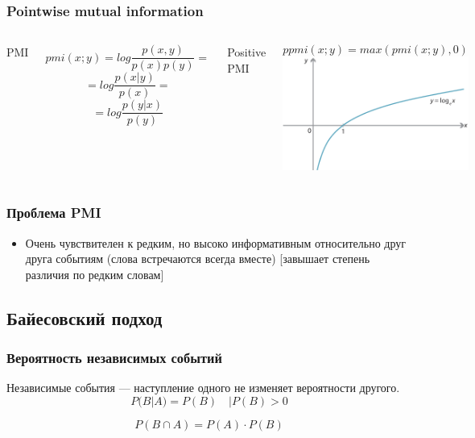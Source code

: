 \documentclass[svgnames]{beamer}
\begin{document}
\begin{frame}
  \frametitle{Pointwise mutual information}
  \begin{columns}
    PMI

  $$
  pmi(x;y) = log \frac{p(x,y)}{p(x)p(y)} =
  $$
  $$
  = log \frac{p(x|y)}{p(x)} =
  $$
  $$
  = log \frac{p(y|x)}{p(y)}
  $$

  Positive PMI

    $$
    ppmi(x;y) = max(pmi(x;y),0)
    $$    
  \includegraphics[width=\textwidth]{log}
  \end{columns}
\end{frame}

\begin{frame}
  \frametitle{Проблема PMI}
  \begin{itemize}
  \item Очень чувствителен к редким, но высоко информативным
    относительно друг друга событиям (слова встречаются всегда вместе)
    [завышает степень различия по редким словам]
  \end{itemize}
\end{frame}

\subsection{Байесовский подход}

\begin{frame}
  \frametitle{Вероятность независимых событий}
  Независимые события — наступление одного не изменяет вероятности
  другого.
  \begin{equation}
    P(B|A) = P(B) \quad | P(B) > 0
  \end{equation}

  \begin{equation}
    P(B \cap A) = P(A) \cdot P(B)
  \end{equation}
\end{frame}
\end{document}
